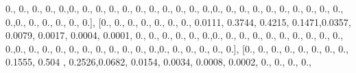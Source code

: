 \documentclass[
]{book}
\newenvironment{Shaded}{\begin{snugshade}}{\end{snugshade}}
\newcommand{\FloatTok}[1]{\textcolor[rgb]{0.00,0.00,0.81}{#1}}
\newcommand{\NormalTok}[1]{#1}
\begin{document}
\begin{Shaded}
\begin{Highlighting}[]
\FloatTok{0.}\NormalTok{, }\FloatTok{0.}\NormalTok{, }\FloatTok{0.}\NormalTok{, }\FloatTok{0.}\NormalTok{, }\FloatTok{0.}\NormalTok{,}\FloatTok{0.}\NormalTok{, }\FloatTok{0.}\NormalTok{, }\FloatTok{0.}\NormalTok{, }\FloatTok{0.}\NormalTok{, }\FloatTok{0.}\NormalTok{, }\FloatTok{0.}\NormalTok{, }\FloatTok{0.}\NormalTok{, }\FloatTok{0.}\NormalTok{, }\FloatTok{0.}\NormalTok{, }\FloatTok{0.}\NormalTok{, }\FloatTok{0.}\NormalTok{,}\FloatTok{0.}\NormalTok{, }\FloatTok{0.}\NormalTok{, }\FloatTok{0.}\NormalTok{, }\FloatTok{0.}\NormalTok{,}
\FloatTok{0.}\NormalTok{, }\FloatTok{0.}\NormalTok{, }\FloatTok{0.}\NormalTok{, }\FloatTok{0.}\NormalTok{, }\FloatTok{0.}\NormalTok{, }\FloatTok{0.}\NormalTok{, }\FloatTok{0.}\NormalTok{,}\FloatTok{0.}\NormalTok{, }\FloatTok{0.}\NormalTok{, }\FloatTok{0.}\NormalTok{, }\FloatTok{0.}\NormalTok{, }\FloatTok{0.}\NormalTok{, }\FloatTok{0.}\NormalTok{], [}\FloatTok{0.}\NormalTok{, }\FloatTok{0.}\NormalTok{, }\FloatTok{0.}\NormalTok{, }\FloatTok{0.}\NormalTok{, }\FloatTok{0.}\NormalTok{, }\FloatTok{0.}\NormalTok{, }\FloatTok{0.}\NormalTok{,}
\FloatTok{0.0111}\NormalTok{, }\FloatTok{0.3744}\NormalTok{, }\FloatTok{0.4215}\NormalTok{, }\FloatTok{0.1471}\NormalTok{,}\FloatTok{0.0357}\NormalTok{, }\FloatTok{0.0079}\NormalTok{, }\FloatTok{0.0017}\NormalTok{, }\FloatTok{0.0004}\NormalTok{, }\FloatTok{0.0001}\NormalTok{, }\FloatTok{0.}\NormalTok{, }\FloatTok{0.}\NormalTok{,}
\FloatTok{0.}\NormalTok{, }\FloatTok{0.}\NormalTok{, }\FloatTok{0.}\NormalTok{, }\FloatTok{0.}\NormalTok{,}\FloatTok{0.}\NormalTok{, }\FloatTok{0.}\NormalTok{, }\FloatTok{0.}\NormalTok{, }\FloatTok{0.}\NormalTok{, }\FloatTok{0.}\NormalTok{, }\FloatTok{0.}\NormalTok{, }\FloatTok{0.}\NormalTok{, }\FloatTok{0.}\NormalTok{, }\FloatTok{0.}\NormalTok{, }\FloatTok{0.}\NormalTok{, }\FloatTok{0.}\NormalTok{,}\FloatTok{0.}\NormalTok{, }\FloatTok{0.}\NormalTok{, }\FloatTok{0.}\NormalTok{, }\FloatTok{0.}\NormalTok{, }\FloatTok{0.}\NormalTok{,}
\FloatTok{0.}\NormalTok{, }\FloatTok{0.}\NormalTok{, }\FloatTok{0.}\NormalTok{, }\FloatTok{0.}\NormalTok{, }\FloatTok{0.}\NormalTok{, }\FloatTok{0.}\NormalTok{,}\FloatTok{0.}\NormalTok{, }\FloatTok{0.}\NormalTok{, }\FloatTok{0.}\NormalTok{, }\FloatTok{0.}\NormalTok{, }\FloatTok{0.}\NormalTok{, }\FloatTok{0.}\NormalTok{], [}\FloatTok{0.}\NormalTok{, }\FloatTok{0.}\NormalTok{, }\FloatTok{0.}\NormalTok{, }\FloatTok{0.}\NormalTok{, }\FloatTok{0.}\NormalTok{, }\FloatTok{0.}\NormalTok{, }\FloatTok{0.}\NormalTok{, }\FloatTok{0.}\NormalTok{,}
\FloatTok{0.1555}\NormalTok{, }\FloatTok{0.504}\NormalTok{ , }\FloatTok{0.2526}\NormalTok{,}\FloatTok{0.0682}\NormalTok{, }\FloatTok{0.0154}\NormalTok{, }\FloatTok{0.0034}\NormalTok{, }\FloatTok{0.0008}\NormalTok{, }\FloatTok{0.0002}\NormalTok{, }\FloatTok{0.}\NormalTok{, }\FloatTok{0.}\NormalTok{, }\FloatTok{0.}\NormalTok{, }\FloatTok{0.}\NormalTok{,}

\end{Highlighting}
\end{Shaded}
\end{document}
